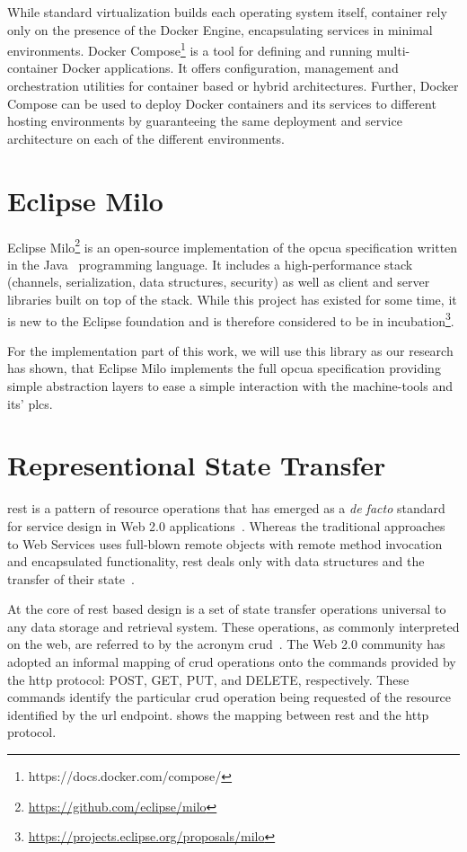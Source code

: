 \documentclass[
a4paper,
twoside,
headsepline,
cleardoublepage=empty,
parskip=half,
draft=false
]{scrbook}
\begin{document}
			While standard virtualization builds each operating system itself, container rely only on the presence of the Docker Engine, encapsulating services in minimal environments.
			Docker Compose\footnote{https://docs.docker.com/compose/} is a tool for defining and running multi-container Docker applications. It offers configuration, management and orchestration utilities for container based or hybrid architectures. Further, Docker Compose can be used to deploy Docker containers and its services to different hosting environments by guaranteeing the same deployment and service architecture on each of the different environments.

		\section{Eclipse Milo}\label{sec:eclipse_milo}

			Eclipse Milo\footnote{\url{https://github.com/eclipse/milo}} is an open-source implementation of the \gls{opcua} specification written in the Java~\cite{java2015} programming language. 
			It includes a high-performance stack (channels, serialization, data structures, security) as well as client and server libraries built on top of the stack.
			While this project has existed for some time, it is new to the Eclipse foundation and is therefore considered to be in incubation\footnote{\url{https://projects.eclipse.org/proposals/milo}}.
			
			For the implementation part of this work, we will use this library as our research has shown, that Eclipse Milo implements the full \gls{opcua} specification providing simple abstraction layers to ease a simple interaction with the machine-tools and its' \gls{plc}s.

		\section{Representional State Transfer}\label{sec:rest}

			\gls{rest} is a pattern of resource operations that has emerged as a \textit{de facto} standard for service design in Web 2.0 applications~\cite{battle2008bridging}. Whereas the traditional approaches to Web Services uses full-blown remote objects with remote method invocation and encapsulated functionality, \gls{rest} deals only with data structures and the transfer of their state~\cite{fielding2000architectural}.
			
			At the core of \gls{rest} based design is a set of state transfer operations universal to any data storage and retrieval system.
			These operations, as commonly interpreted on the web, are referred to by the acronym \gls{crud}~\cite{battle2008bridging}.
			The Web 2.0 community has adopted an informal mapping of \gls{crud} operations onto the commands provided by the \gls{http} protocol: POST, GET, PUT, and DELETE, respectively. 
			These commands identify the particular \gls{crud} operation being requested of the resource identified by the \gls{url} endpoint.
			 shows the mapping between \gls{rest} and the \gls{http} protocol.
			
\end{document}
